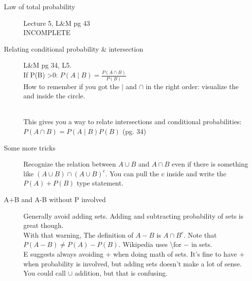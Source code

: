 \begin{description}
 \item[Law of total probability] Lecture 5, L\&M pg 43   \hfill \\
 INCOMPLETE
  \hfill \\
 
\item[Relating conditional probability \& intersection]     L\&M pg 34, L5. \hfill \\
If P(B) \textgreater 0:
$P(A \mid B) = \frac{ P(A \cap B) }{ P(B) } $  \hfill \\
How to remember if you got the $\mid$ and $\cap$ in the right order: visualize the and inside the circle.

\hfill \\
This gives you a way to relate intersections and conditional probabilities:
$P(A \cap B) = P(A \mid B)P(B)$  (pg. 34)

\item[Some more tricks]
	Recognize the relation between $A \cup B$  and $A \cap B$ even if there is something like $(A \cup B) \cap (A \cup B)^c$.  You can pull the c inside and write the $P(A) + P(B)$ type statement.
	
\item[A+B and A-B without P involved]
Generally avoid adding sets.  Adding and subtracting probability of sets is great though. \hfill \\
With that warning, The definition of $A-B$ is $A \cap B^c$.  Note that $P(A-B) \neq P(A) - P(B)$.  Wikipedia uses \textbackslash  for $-$ in sets. \hfill \\ 
E suggests always avoiding + when doing math of sets.  It's fine to have + when probability is involved, but adding sets doesn't make a lot of sense.  You could call $\cup$ addition, but that is confusing.  
  





\end{description}
    
    
    
    
    
    
    
    
    
